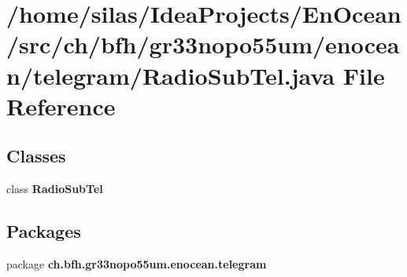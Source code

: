 \section{/home/silas/\+Idea\+Projects/\+En\+Ocean/src/ch/bfh/gr33nopo55um/enocean/telegram/\+Radio\+Sub\+Tel.java File Reference}
\label{RadioSubTel_8java}
\subsection*{Classes}
\begin{DoxyCompactItemize}
\item 
class {\bf Radio\+Sub\+Tel}
\end{DoxyCompactItemize}
\subsection*{Packages}
\begin{DoxyCompactItemize}
\item 
package {\bf ch.\+bfh.\+gr33nopo55um.\+enocean.\+telegram}
\end{DoxyCompactItemize}
